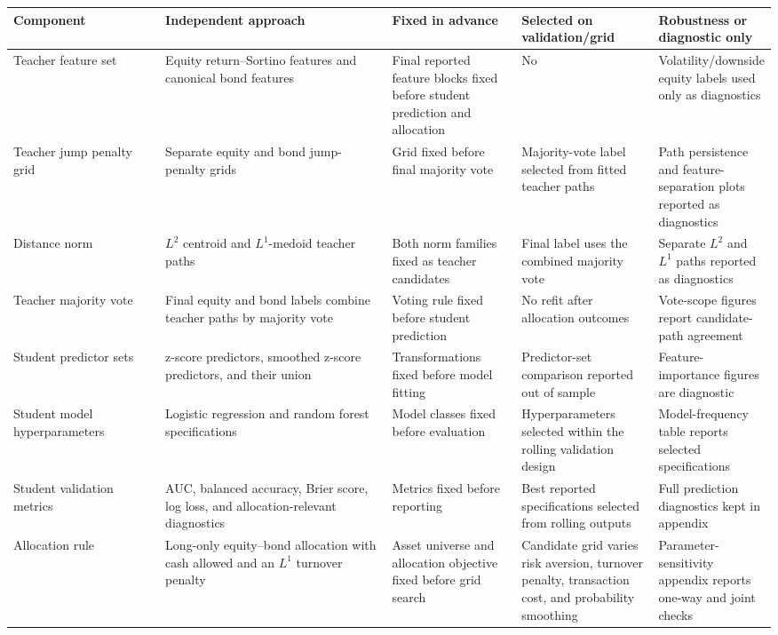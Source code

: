 \begin{table}[H]
\centering
\small
\begin{adjustbox}{center,max width=\linewidth}
\begin{tabular}{p{0.20\linewidth}p{0.30\linewidth}p{0.17\linewidth}p{0.18\linewidth}p{0.18\linewidth}}
\toprule
Component & Independent approach & Fixed in advance & Selected on validation/grid & Robustness or diagnostic only \\
\midrule
Teacher feature set & Equity return--Sortino features and canonical bond features & Final reported feature blocks fixed before student prediction and allocation & No & Volatility/downside equity labels used only as diagnostics \\
Teacher jump penalty grid & Separate equity and bond jump-penalty grids & Grid fixed before final majority vote & Majority-vote label selected from fitted teacher paths & Path persistence and feature-separation plots reported as diagnostics \\
Distance norm & $L^2$ centroid and $L^1$-medoid teacher paths & Both norm families fixed as teacher candidates & Final label uses the combined majority vote & Separate $L^2$ and $L^1$ paths reported as diagnostics \\
Teacher majority vote & Final equity and bond labels combine teacher paths by majority vote & Voting rule fixed before student prediction & No refit after allocation outcomes & Vote-scope figures report candidate-path agreement \\
Student predictor sets & z-score predictors, smoothed z-score predictors, and their union & Transformations fixed before model fitting & Predictor-set comparison reported out of sample & Feature-importance figures are diagnostic \\
Student model hyperparameters & Logistic regression and random forest specifications & Model classes fixed before evaluation & Hyperparameters selected within the rolling validation design & Model-frequency table reports selected specifications \\
Student validation metrics & AUC, balanced accuracy, Brier score, log loss, and allocation-relevant diagnostics & Metrics fixed before reporting & Best reported specifications selected from rolling outputs & Full prediction diagnostics kept in appendix \\
Allocation rule & Long-only equity--bond allocation with cash allowed and an $L^1$ turnover penalty & Asset universe and allocation objective fixed before grid search & Candidate grid varies risk aversion, turnover penalty, transaction cost, and probability smoothing & Parameter-sensitivity appendix reports one-way and joint checks \\

\end{tabular}
\end{adjustbox}
\end{table}
